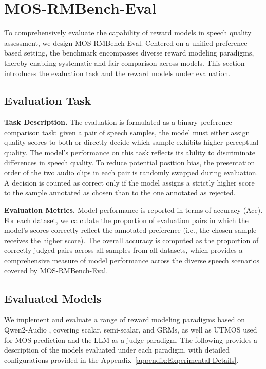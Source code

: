 \section{MOS-RMBench-Eval}
To comprehensively evaluate the capability of reward models in speech quality assessment, we design MOS-RMBench-Eval. Centered on a unified preference-based setting, the benchmark encompasses diverse reward modeling paradigms, thereby enabling systematic and fair comparison across models. This section introduces the evaluation task and the reward models under evaluation.

\subsection{Evaluation Task}
\textbf{Task Description.}
The evaluation is formulated as a binary preference comparison task: given a pair of speech samples, the model must either assign quality scores to both or directly decide which sample exhibits higher perceptual quality. The model’s performance on this task reflects its ability to discriminate differences in speech quality.
To reduce potential position bias, the presentation order of the two audio clips in each pair is randomly swapped during evaluation. A decision is counted as correct only if the model assigns a strictly higher score to the sample annotated as chosen than to the one annotated as rejected.

\textbf{Evaluation Metrics.}
Model performance is reported in terms of accuracy (Acc). For each dataset, we calculate the proportion of evaluation pairs in which the model's scores correctly reflect the annotated preference (i.e., the chosen sample receives the higher score). The overall accuracy is computed as the proportion of correctly judged pairs across all samples from all datasets, which provides a comprehensive measure of model performance across the diverse speech scenarios covered by MOS-RMBench-Eval.

\subsection{Evaluated Models}
We implement and evaluate a range of reward modeling paradigms based on Qwen2-Audio \citep{chu2024qwen2}, covering scalar, semi-scalar, and GRMs, as well as UTMOS used for MOS prediction and the LLM-as-a-judge \citep{llmasajudge} paradigm. The following provides a description of the models evaluated under each paradigm, with detailed configurations provided in the Appendix~\ref{appendix:Experimental-Details}.

